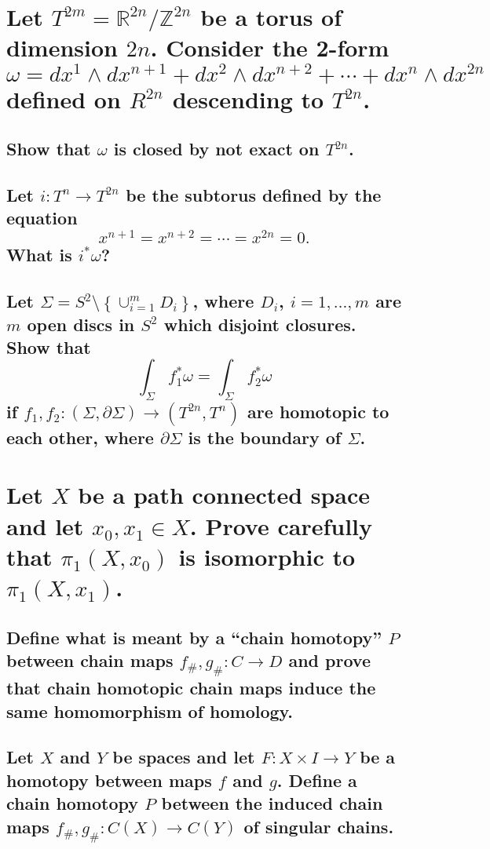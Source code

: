 \documentclass[10pt]{article}
\newcommand{\advsection}{\addtocounter{section}{1} \setcounter{subsection}{0}}
\begin{document}
\section{Let $T^{2m} = \mathbb{R}^{2n} / \mathbb{Z}^{2n}$ be a torus of dimension $2n$. Consider the
  2-form
  $$\omega = dx^1 \wedge dx^{n+1} + dx^2 \wedge dx^{n+2} + \cdots + dx^n \wedge dx^{2n}$$
  defined on $R^{2n}$ descending to $T^{2n}$.}

\subsection{Show that $\omega$ is closed by not exact on $T^{2n}$.}

\subsection{Let $i : T^n \to T^{2n}$ be the subtorus defined by the equation
  $$x^{n+1} =x^{n+2} = \cdots =x^{2n}=0.$$
  What is $i^*\omega$?}

\subsection{Let $\Sigma = S^2 \setminus \left\{ \cup^m_{i=1} D_i \right\}$, where $D_i$,
  $i=1,\dots,m$ are $m$ open discs in $S^2$ which disjoint closures. Show that
  $$ \int_\Sigma f^*_1 \omega = \int_\Sigma f^*_2 \omega$$
  if $f_1, f_2 : (\Sigma, \partial \Sigma) \to (T^{2n}, T^n)$ are homotopic to each other, where
  $\partial \Sigma$ is the boundary of $\Sigma$.}

\section{Let $X$ be a path connected space and let $x_0, x_1 \in X$. Prove carefully that
  $\pi_1(X,x_0)$ is isomorphic to $\pi_1(X,x_1)$.}


\advsection{}

\subsection{Define what is meant by a ``chain homotopy'' $P$ between chain maps $f_\#, g_\#: C \to
  D$ and prove that chain homotopic chain maps induce the same homomorphism of homology.}

\subsection{Let $X$ and $Y$ be spaces and let $F: X \times I \to Y$ be a homotopy between maps $f$
  and $g$. Define a chain homotopy $P$ between the induced chain maps $f_\#, g_\#: C(X) \to C(Y)$ of
  singular chains.}
\end{document}
